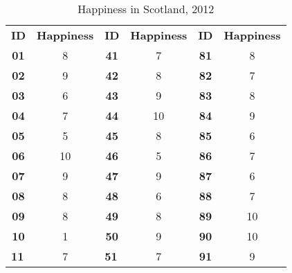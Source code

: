 \documentclass{article}
\begin{document}
\begin{table}[]
	\centering
	\caption{Happiness in Scotland, 2012}
	\begin{tabular}{cccccc}
		\textbf{ID}                     & \textbf{Happiness} & \textbf{ID}                     & \textbf{Happiness} & \textbf{ID}                   & \textbf{Happiness}            \\
		\textbf{01}                     & 8                  & \textbf{41}                     & 7                  & \textbf{81}                   & 8                             \\
		\textbf{02}                     & 9                  & \textbf{42}                     & 8                  & \textbf{82}                   & 7                             \\
		\textbf{03}                     & 6                  & \textbf{43}                     & 9                  & \textbf{83}                   & 8                             \\
		\textbf{04}                     & 7                  & \textbf{44}                     & 10                 & \textbf{84}                   & 9                             \\
		\textbf{05}                     & 5                  & \textbf{45}                     & 8                  & \textbf{85}                   & 6                             \\
		\textbf{06}                     & 10                 & \textbf{46}                     & 5                  & \textbf{86}                   & 7                             \\
		\textbf{07}                     & 9                  & \textbf{47}                     & 9                  & \textbf{87}                   & 6                             \\
		\textbf{08}                     & 8                  & \textbf{48}                     & 6                  & \textbf{88}                   & 7                             \\
		\textbf{09}                     & 8                  & \textbf{49}                     & 8                  & \textbf{89}                   & 10                            \\
		\textbf{10}                     & 1                  & \textbf{50}                     & 9                  & \textbf{90}                   & 10                            \\
		\multicolumn{1}{l}{\textbf{11}} & 7                  & \multicolumn{1}{l}{\textbf{51}} & 7                  & \textbf{91}                   & 9                             \\

\end{tabular}
\end{table}
\end{document}
